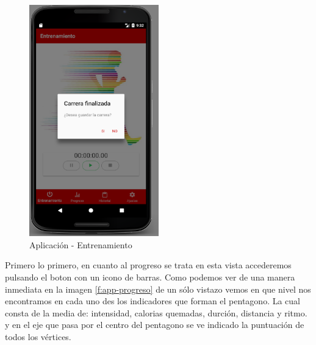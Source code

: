 \documentclass[a4paper, 11pt]{article}
\begin{document}
\begin{itemize}
            \begin{figure}[H]
             \centering
             \includegraphics[width=0.5\textwidth]{4stop}
             \caption{Aplicación - Entrenamiento}
             \label{f:app-stop}
            \end{figure}

  Primero lo primero, en cuanto al progreso se trata en esta vista accederemos pulsando el boton con un
  icono de barras. Como podemos ver de una manera inmediata en la imagen \ref{f:app-progreso} de un sólo
  vistazo vemos en que nivel nos encontramos en cada uno des los indicadores que forman el pentagono. La
  cual consta de la media de: intensidad, calorias quemadas, durción, distancia y ritmo. y en el eje que
  pasa por el centro del pentagono se ve indicado la puntuación de todos los vértices.\\



\end{itemize}
\end{document}

